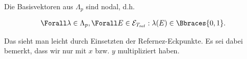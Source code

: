 \begin{solution}
\begin{enumerate}[label = \textbf{\alph*)}]
  Die Basisvektoren aus $\Lambda_p$ sind nodal, d.h.

  \begin{align*}
    \Forall \lambda \in \Lambda_p,
    \Forall E \in \mathcal{E}_{T_\mathrm{ref}}:
    \lambda(E) \in \Bbraces{0, 1}.
  \end{align*}

  Das sieht man leicht durch Einsetzten der Refernez-Eckpunkte.
  Es sei dabei bemerkt, dass wir nur mit $x$ bzw. $y$ multipliziert haben.

\end{enumerate}

\end{solution}

